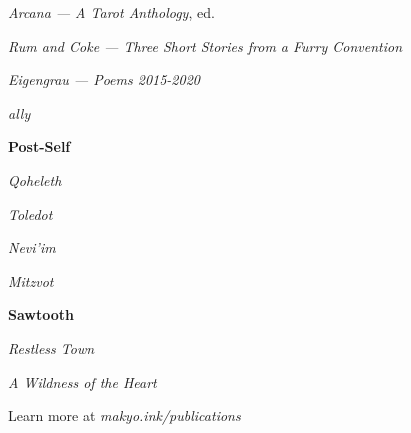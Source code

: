 \singlespacing
\thispagestyle{empty}
\begin{center}
    \TitleFamily

    \vspace{2ex}

    \emph{Arcana — A Tarot Anthology}, ed.

    \vspace{1ex}

    \emph{Rum and Coke — Three Short Stories from a Furry Convention}

    \vspace{1ex}

    \emph{Eigengrau — Poems 2015-2020}

    \vspace{1ex}

    \emph{ally}

    \vspace{2ex}
    
    \textbf{Post-Self}

    \emph{Qoheleth}

    \emph{Toledot}

    \emph{Nevi'im}

    \emph{Mitzvot}

    \vspace{2ex}

    \textbf{Sawtooth}

    \emph{Restless Town}

    \emph{A Wildness of the Heart}

    \vspace{2em}

    Learn more at \emph{makyo.ink/publications}
\end{center}
\vfill
\singlespacing
